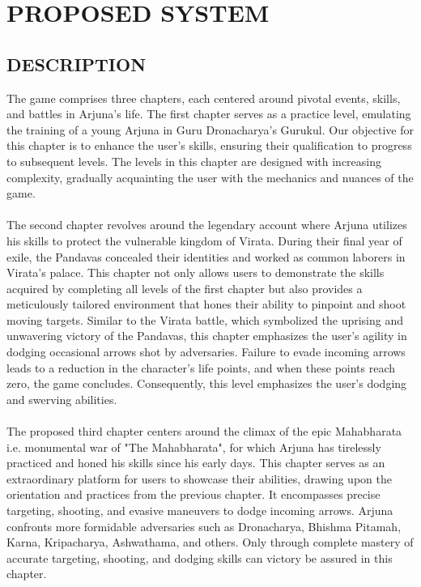	\newpage
	
\section{PROPOSED SYSTEM}
\subsection{DESCRIPTION}
The game comprises three chapters, each centered around pivotal events, skills, and battles in Arjuna's life. The first chapter serves as a practice level, emulating the training of a young Arjuna in Guru Dronacharya's Gurukul. Our objective for this chapter is to enhance the user's skills, ensuring their qualification to progress to subsequent levels. The levels in this chapter are designed with increasing complexity, gradually acquainting the user with the mechanics and nuances of the game.\\
\\
The second chapter revolves around the legendary account where Arjuna utilizes his skills to protect the vulnerable kingdom of Virata. During their final year of exile, the Pandavas concealed their identities and worked as common laborers in Virata's palace. This chapter not only allows users to demonstrate the skills acquired by completing all levels of the first chapter but also provides a meticulously tailored environment that hones their ability to pinpoint and shoot moving targets. Similar to the Virata battle, which symbolized the uprising and unwavering victory of the Pandavas, this chapter emphasizes the user's agility in dodging occasional arrows shot by adversaries. Failure to evade incoming arrows leads to a reduction in the character's life points, and when these points reach zero, the game concludes. Consequently, this level emphasizes the user's dodging and swerving abilities.\\
\\
The proposed third chapter centers around the climax of the epic Mahabharata i.e. monumental war of "The Mahabharata", for which Arjuna has tirelessly practiced and honed his skills since his early days. This chapter serves as an extraordinary platform for users to showcase their abilities, drawing upon the orientation and practices from the previous chapter. It encompasses precise targeting, shooting, and evasive maneuvers to dodge incoming arrows. Arjuna confronts more formidable adversaries such as Dronacharya, Bhishma Pitamah, Karna, Kripacharya, Ashwathama, and others. Only through complete mastery of accurate targeting, shooting, and dodging skills can victory be assured in this chapter.\\
